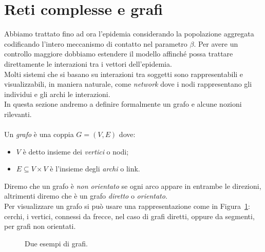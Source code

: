 \section{Reti complesse e grafi}\label{grafi}
Abbiamo trattato fino ad ora l'epidemia considerando la popolazione aggregata codificando l'intero meccanismo di contatto nel parametro $\beta$. Per avere un controllo maggiore dobbiamo estendere il modello affinch\'e possa trattare direttamente le interazioni tra i vettori dell'epidemia.\\
Molti sistemi che si basano su interazioni tra soggetti sono rappresentabili e visualizzabili, in maniera naturale, come \textit{network} dove i nodi rappresentano gli individui e gli archi le interazioni.\\
In questa sezione andremo a definire formalmente un grafo e alcune nozioni rilevanti.\\ \\
Un \textit{grafo} \`e una coppia $G=(V,	E) $ dove:
\begin{itemize}
	\item $V$ \`e detto  insieme dei \textit{vertici} o nodi;
	\item $E\subseteq V \times V$ \`e l'insieme degli \textit{archi} o link.
\end{itemize}
Diremo che un grafo \`e \textit{non orientato} se ogni arco appare in entrambe le direzioni, altrimenti diremo che \`e un grafo \textit{diretto} o \textit{orientato}.\\
Per visualizzare un grafo si pu\`o usare una rappresentazione come in Figura~\ref{fig::esegrafi}: cerchi, i vertici, connessi da frecce, nel caso di grafi diretti, oppure da segmenti, per grafi non orientati. 
\begin{figure}[ht]
\centering
{}  \hfill
{}
\caption{Due esempi di grafi.}
\label{fig::esegrafi}
\end{figure}

